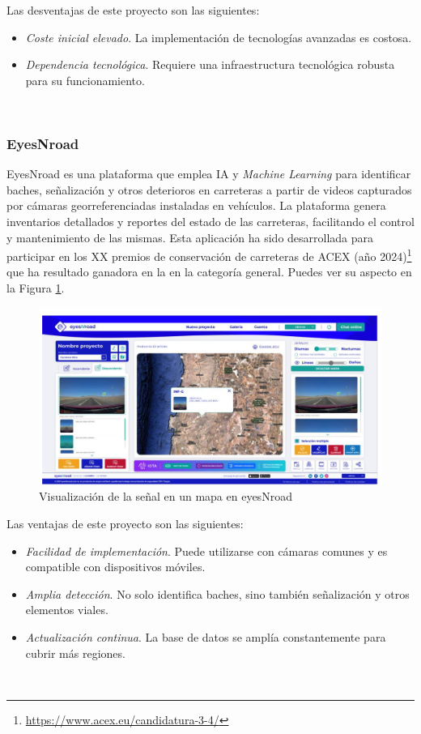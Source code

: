 Las desventajas de este proyecto son las siguientes:
\begin{itemize}
	\item \textit{Coste inicial elevado}. La implementación de tecnologías avanzadas es costosa.
	\item \textit{Dependencia tecnológica}. Requiere una infraestructura tecnológica robusta para su funcionamiento.
\end{itemize}\


\subsubsection{EyesNroad}

EyesNroad es una plataforma que emplea \ac{IA} y \textit{Machine Learning} para identificar baches, señalización y otros deterioros en carreteras a partir de videos capturados por cámaras georreferenciadas instaladas en vehículos. La plataforma genera inventarios detallados y reportes del estado de las carreteras, facilitando el control y mantenimiento de las mismas. Esta aplicación ha sido desarrollada para participar en los XX premios de conservación de carreteras de \ac{ACEX} (año 2024)\footnote{\url{https://www.acex.eu/candidatura-3-4/}} que ha resultado ganadora en la en la categoría general. Puedes ver su aspecto en la Figura \ref{fig:enr}.

\begin{figure} [h!]
	\begin{center}
		\includegraphics[width=16cm]{figs/enr.png}
	\end{center}
	\caption{Visualización de la señal en un mapa en eyesNroad}
	\label{fig:enr}
\end{figure}


Las ventajas de este proyecto son las siguientes:

\begin{itemize}
	\item \textit{Facilidad de implementación}. Puede utilizarse con cámaras comunes y es compatible con dispositivos móviles.
	\item \textit{Amplia detección}. No solo identifica baches, sino también señalización y otros elementos viales.
	\item \textit{Actualización continua}. La base de datos se amplía constantemente para cubrir más regiones.
	
\end{itemize}\

